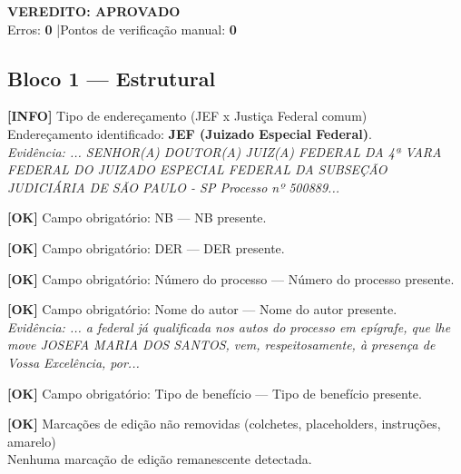 \documentclass[12pt,a4paper]{article}
\newcommand{\statusOK}[1]{\textcolor{corOK}{\textbf{[OK]}} #1}
\newcommand{\statusINFO}[1]{\textcolor{corINFO}{\textbf{[INFO]}} #1}
\begin{document}
\vspace{0.5em}

\noindent\colorbox{corFundoAprovado}{%
  \begin{minipage}{\dimexpr\linewidth-2\fboxsep}
    \centering
    \vspace{0.3em}
    {\large \textcolor{corOK}{\textbf{VEREDITO: APROVADO}}}\\
    Erros: \textbf{0} \quad|\quad Pontos de verificação manual: \textbf{0}
    \vspace{0.3em}
  \end{minipage}%
}

\vspace{1em}


\subsection{Bloco 1 --- Estrutural}

\statusINFO{Tipo de endereçamento (JEF x Justiça Federal comum)}\\
Endereçamento identificado: \textbf{JEF (Juizado Especial Federal)}.\\
\textit{Evidência: ... SENHOR(A) DOUTOR(A) JUIZ(A) FEDERAL DA 4ª VARA FEDERAL DO JUIZADO ESPECIAL FEDERAL DA SUBSEÇÃO JUDICIÁRIA DE SÃO PAULO - SP Processo nº 500889...}

\medskip
\statusOK{Campo obrigatório: NB} --- NB presente.

\medskip
\statusOK{Campo obrigatório: DER} --- DER presente.

\medskip
\statusOK{Campo obrigatório: Número do processo} --- Número do processo presente.

\medskip
\statusOK{Campo obrigatório: Nome do autor} --- Nome do autor presente.\\
\textit{Evidência: ... a federal já qualificada nos autos do processo em epígrafe, que lhe move JOSEFA MARIA DOS SANTOS, vem, respeitosamente, à presença de Vossa Excelência, por...}

\medskip
\statusOK{Campo obrigatório: Tipo de benefício} --- Tipo de benefício presente.

\medskip
\statusOK{Marcações de edição não removidas (colchetes, placeholders, instruções, amarelo)}\\
Nenhuma marcação de edição remanescente detectada.
\end{document}
